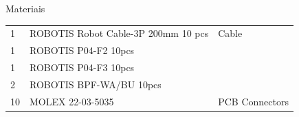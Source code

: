 \begin{frame}[c]{Materiais}
\begin{center}
\begin{table}[]
\begin{tabular}{lll}
    \rowcolor[HTML]{FCFCFC} 
    {\color[HTML]{404040} 1}             & {\color[HTML]{404040} ROBOTIS Robot Cable-3P 200mm 10 pcs} & {\color[HTML]{404040} Cable}                 \\
    \rowcolor[HTML]{F3F6F6} 
    {\color[HTML]{404040} 1}             & {\color[HTML]{404040} ROBOTIS P04-F2 10pcs}                & {\color[HTML]{404040} }                      \\
    \rowcolor[HTML]{FCFCFC} 
    {\color[HTML]{404040} 1}             & {\color[HTML]{404040} ROBOTIS P04-F3 10pcs}                & {\color[HTML]{404040} }                      \\
    \rowcolor[HTML]{F3F6F6} 
    {\color[HTML]{404040} 2}             & {\color[HTML]{404040} ROBOTIS BPF-WA/BU 10pcs}             & {\color[HTML]{404040} }                      \\
    \rowcolor[HTML]{FCFCFC} 
    {\color[HTML]{404040} 10}            & {\color[HTML]{404040} MOLEX 22-03-5035}                    & {\color[HTML]{404040} PCB Connectors}       
    \end{tabular}
    \end{table}
   \end{center}

 \end{frame}
